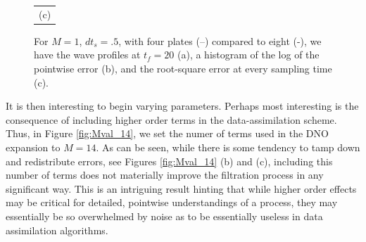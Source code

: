 \begin{figure}
\begin{tabular}{c}
(c)
\end{tabular}
\caption{For $M=1$, $dt_{s}=.5$, with four plates (--) compared to eight (-), we have the wave profiles at $t_{f}=20$ (a), a histogram of the log of the pointwise error (b), and the root-square error at every sampling time (c).} 
\label{fig:Mval_1}
\end{figure}

It is then interesting to begin varying parameters.  Perhaps most interesting is the consequence of including higher order terms in the data-assimilation scheme.  Thus, in Figure \ref{fig:Mval_14}, we set the numer of terms used in the DNO expansion to $M=14$.  As can be seen, while there is some tendency to tamp down and redistribute errors, see Figures \ref{fig:Mval_14} (b) and (c), including this number of terms does not materially improve the filtration process in any significant way.  This is an intriguing result hinting that while higher order effects may be critical for detailed, pointwise understandings of a process, they may essentially be so overwhelmed by noise as to be essentially useless in data assimilation algorithms.  
